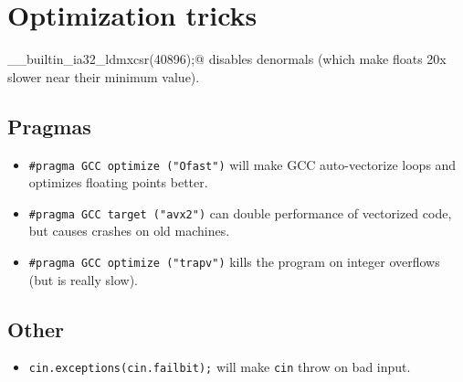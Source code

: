 \section{Optimization tricks}
	\verb@__builtin_ia32_ldmxcsr(40896);@ disables denormals (which make floats 20x slower near their minimum value).
	\subsection{Pragmas}
		\begin{itemize}
			\item \lstinline{#pragma GCC optimize ("Ofast")} will make GCC auto-vectorize loops and optimizes floating points better.
			\item \lstinline{#pragma GCC target ("avx2")} can double performance of vectorized code, but causes crashes on old machines.
			\item \lstinline{#pragma GCC optimize ("trapv")} kills the program on integer overflows (but is really slow).
		\end{itemize}
	\subsection{Other}
		\begin{itemize}
			\item \lstinline{cin.exceptions(cin.failbit);} will make \lstinline{cin} throw on bad input.
		\end{itemize}
